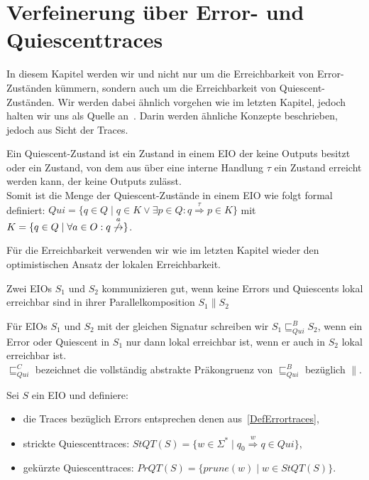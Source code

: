 \chapter{Verfeinerung über Error- und Quiescenttraces}

In diesem Kapitel werden wir und nicht nur um die Erreichbarkeit von
Error-Zuständen kümmern, sondern auch um die Erreichbarkeit von
Quiescent-Zuständen. Wir werden dabei ähnlich vorgehen wie im letzten Kapitel,
jedoch halten wir uns als Quelle an~\cite{Chilton2013}. Darin werden ähnliche Konzepte
beschrieben, jedoch aus Sicht der Traces.

\begin{Def}[Quiescent]
  Ein Quiescent-Zustand ist ein Zustand in einem EIO der keine Outputs besitzt
  oder ein Zustand, von dem aus über eine interne Handlung $\tau$ ein Zustand
  erreicht werden kann, der keine Outputs zulässt.\\
  Somit ist die Menge der Quiescent-Zustände in einem EIO wie folgt formal
  definiert: $Qui=\{q\in Q\mid q\in K\vee \exists p\in Q:
  q\overset{\tau}{\Rightarrow} p\in K\}$ mit $K=\{q\in Q\mid \forall a\in O:
  q\overset{a}{\not{\hspace{-0.1cm}\rightarrow}}\}$.
\end{Def}

Für die Erreichbarkeit verwenden wir wie im letzten Kapitel wieder den
optimistischen Ansatz der lokalen Erreichbarkeit.

\begin{Def}
  Zwei EIOs $S_1$ und $S_2$ kommunizieren gut, wenn keine Errors und Quiescents
  lokal erreichbar sind in ihrer Parallelkomposition $S_1\| S_2$
\end{Def}

\begin{Def}
  Für EIOs $S_1$ und $S_2$ mit der gleichen Signatur schreiben wir
  $S_1\sqsubseteq _{Qui}^B S_2$, wenn ein Error oder Quiescent in $S_1$ nur
  dann lokal erreichbar ist, wenn er auch in $S_2$ lokal erreichbar ist.\\
  $\sqsubseteq _{Qui}^C$ bezeichnet die vollständig abstrakte Präkongruenz von
  $\sqsubseteq  _{Qui}^ B$ bezüglich $\|$.
\end{Def}

\begin{Def}
  \label{DefQuiescenttraces}
  Sei $S$ ein EIO und definiere:
  \begin{itemize}
    \item die Traces bezüglich Errors entsprechen denen
      aus~\ref{DefErrortraces},
    \item strickte Quiescenttraces: $StQT(S) = \{w\in\Sigma ^*\mid q_0
      \overset{w}{\Rightarrow} q\in Qui\}$,
    \item gekürzte Quiescenttraces: $PrQT(S) = \{prune(w)\mid w\in StQT(S)\}$.
  \end{itemize}
\end{Def}


